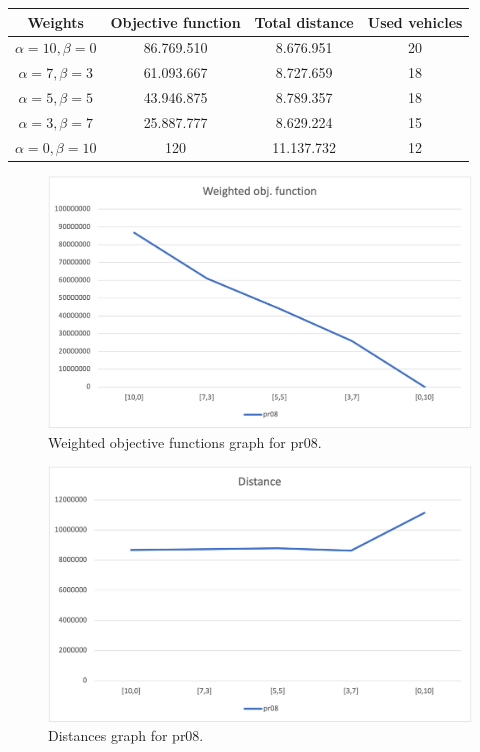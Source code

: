 {
\renewcommand{\arraystretch}{2}
\begin{longtable}[h]{| c | c | c | c |}
    \hline
    \textbf{Weights} & \textbf{Objective function} & \textbf{Total distance} & \textbf{Used vehicles} \\
    \hline
    \endhead
    $\alpha = 10, \beta = 0$ & 86.769.510 &  8.676.951 & 20 \\
    \hline
    $\alpha = 7, \beta = 3$  & 61.093.667 &  8.727.659 & 18 \\
    \hline
    $\alpha = 5, \beta = 5$  & 43.946.875 &  8.789.357 & 18 \\
    \hline
    $\alpha = 3, \beta = 7$  & 25.887.777 &  8.629.224 & 15 \\
    \hline
    $\alpha = 0, \beta = 10$ &        120 & 11.137.732 & 12 \\
    \hline
\end{longtable}
}
\begin{figure}[H]
    \centering
    \includegraphics[width=1.0\columnwidth]{../graphs/pr08-wobjf.png}
    \caption{Weighted objective functions graph for pr08.}
\end{figure}

\begin{figure}[H]
    \centering
    \includegraphics[width=1.0\columnwidth]{../graphs/pr08-distance.png}
    \caption{Distances graph for pr08.}
\end{figure}

